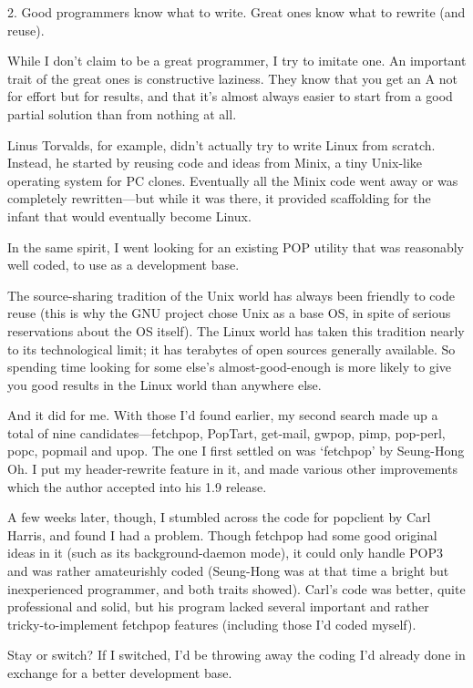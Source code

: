 \documentclass[a4paper,12pt,UTF8,twoside]{ctexbook}
\begin{document}
2. Good programmers know what to write. Great ones know what to rewrite (and reuse).

While I don't claim to be a great programmer, I try to imitate one. An important trait of the great ones is constructive laziness. They know that you get an A not for effort but for results, and that it's almost always easier to start from a good partial solution than from nothing at all.

Linus Torvalds, for example, didn't actually try to write Linux from scratch. Instead, he started by reusing code and ideas from Minix, a tiny Unix-like operating system for PC clones. Eventually all the Minix code went away or was completely rewritten—but while it was there, it provided scaffolding for the infant that would eventually become Linux.

In the same spirit, I went looking for an existing POP utility that was reasonably well coded, to use as a development base.

The source-sharing tradition of the Unix world has always been friendly to code reuse (this is why the GNU project chose Unix as a base OS, in spite of serious reservations about the OS itself). The Linux world has taken this tradition nearly to its technological limit; it has terabytes of open sources generally available. So spending time looking for some else's almost-good-enough is more likely to give you good results in the Linux world than anywhere else.

And it did for me. With those I'd found earlier, my second search made up a total of nine candidates—fetchpop, PopTart, get-mail, gwpop, pimp, pop-perl, popc, popmail and upop. The one I first settled on was `fetchpop' by Seung-Hong Oh. I put my header-rewrite feature in it, and made various other improvements which the author accepted into his 1.9 release.

A few weeks later, though, I stumbled across the code for popclient by Carl Harris, and found I had a problem. Though fetchpop had some good original ideas in it (such as its background-daemon mode), it could only handle POP3 and was rather amateurishly coded (Seung-Hong was at that time a bright but inexperienced programmer, and both traits showed). Carl's code was better, quite professional and solid, but his program lacked several important and rather tricky-to-implement fetchpop features (including those I'd coded myself).

Stay or switch? If I switched, I'd be throwing away the coding I'd already done in exchange for a better development base.
\end{document}

